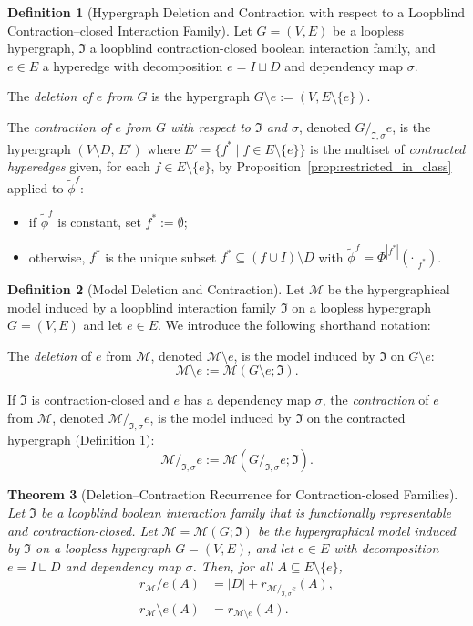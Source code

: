 \documentclass[11pt,reqno]{amsart}
\newcommand{\Mo}{\mathcal{M}}
\newcommand{\IFam}{\mathfrak{I}}
\theoremstyle{plain}
\newtheorem{theorem}{Theorem}[section]
\theoremstyle{definition}
\newtheorem{definition}[theorem]{Definition}
\numberwithin{equation}{section}
\begin{document}
\begin{definition}[Hypergraph Deletion and Contraction with respect to a Loopblind Contraction--closed Interaction Family]
\label{def:induced_hyper_contraction}
Let $G=(V,E)$ be a loopless hypergraph, $\IFam$ a loopblind contraction-closed boolean interaction family, and $e \in E$ a hyperedge with decomposition $e = I \sqcup D$ and dependency map $\sigma$.

The \emph{deletion of $e$ from $G$} is the hypergraph $G \setminus e := (V, E \setminus \{e\})$.

The \emph{contraction of $e$ from $G$ with respect to $\IFam$ and $\sigma$}, denoted $G /_{\IFam, \sigma} e$, is the hypergraph $(V \setminus D,\, E')$ where $E' = \{ f^* \mid f \in E \setminus \{e\} \}$ is the multiset of \emph{contracted hyperedges} given, for each $f \in E \setminus \{e\}$, by Proposition~\ref{prop:restricted_in_class} applied to $\widetilde\phi^f$:
\begin{itemize}
    \item if $\widetilde\phi^f$ is constant, set $f^* := \emptyset$;
    \item otherwise, $f^*$ is the unique subset $f^* \subseteq (f \cup I) \setminus D$ with $\widetilde\phi^f = \Phi^{|f^*|}(\cdot|_{f^*})$.
\end{itemize}
\end{definition}
\begin{definition}[Model Deletion and Contraction]
\label{def:model_delcon}
Let $\Mo$ be the hypergraphical model induced by a loopblind interaction family $\IFam$ on a loopless hypergraph $G =(V,E)$ and let $e \in E$. We introduce the following shorthand notation:

The \emph{deletion} of $e$ from $\Mo$, denoted $\Mo \setminus e$, is the model induced by $\IFam$ on $G \setminus e$:
\[ \Mo \setminus e := \Mo(G \setminus e; \IFam). \]

If $\IFam$ is contraction-closed and $e$ has a dependency map $\sigma$, the \emph{contraction} of $e$ from $\Mo$, denoted $\Mo /_{\IFam,\sigma} e$, is the model induced by $\IFam$ on the contracted hypergraph (Definition \ref{def:induced_hyper_contraction}):
\[ \Mo /_{\IFam,\sigma} e := \Mo(G/_{\IFam, \sigma} e; \IFam). \]
\end{definition}

\begin{theorem}[Deletion--Contraction Recurrence for Contraction-closed Families]
\label{theo:contraction_closure}
Let $\IFam$ be a loopblind boolean interaction family that is functionally representable and contraction-closed. Let $\Mo = \Mo(G; \IFam)$ be the hypergraphical model induced by $\IFam$ on a loopless hypergraph $G = (V,E)$, and let $e \in E$ with decomposition $e = I \sqcup D$ and dependency map $\sigma$. Then, for all $A \subseteq E \setminus \{e\}$,
\begin{align}
    r_{\Mo}/e(A) &= |D| + r_{\Mo /_{\IFam,\sigma} e}(A), \\
    r_{\Mo} \setminus e(A) &= r_{\Mo \setminus e}(A).
\end{align}
\end{theorem}
\end{document}
